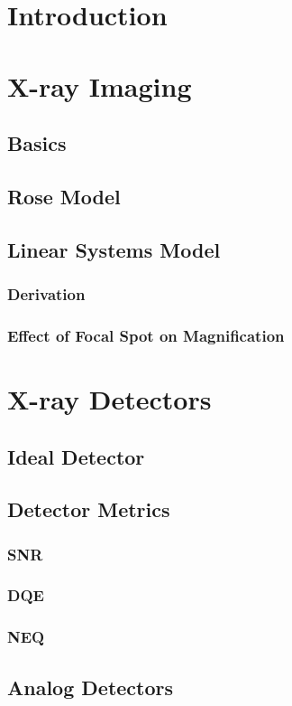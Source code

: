 \documentclass[11pt]{article}
\begin{document}
\tableofcontents

\newpage
\section{Introduction}

\newpage
\section{X-ray Imaging}
\subsection{Basics}
\subsection{Rose Model}
\subsection{Linear Systems Model}
\subsubsection{Derivation}
\subsubsection{Effect of Focal Spot on Magnification}

\newpage
\section{X-ray Detectors}
\subsection{Ideal Detector}
\subsection{Detector Metrics}
\subsubsection{SNR}
\subsubsection{DQE}
\subsubsection{NEQ}
\subsection{Analog Detectors}
\end{document}
